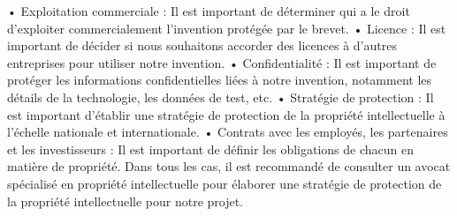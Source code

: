 \begin{itemize}
 •	Exploitation commerciale : Il est important de déterminer qui a le droit d'exploiter commercialement l'invention protégée par le brevet.
 •	Licence : Il est important de décider si nous souhaitons accorder des licences à d'autres entreprises pour utiliser notre invention.
 •	Confidentialité : Il est important de protéger les informations confidentielles liées à notre invention, notamment les détails de la technologie, les données de test, etc.
 •	Stratégie de protection : Il est important d'établir une stratégie de protection de la propriété intellectuelle à l'échelle nationale et internationale.
 •	Contrats avec les employés, les partenaires et les investisseurs : Il est important de définir les obligations de chacun en matière de propriété.
 Dans tous les cas, il est recommandé de consulter un avocat spécialisé en propriété intellectuelle pour élaborer une stratégie de protection de la propriété intellectuelle pour notre projet.
\end{itemize}
